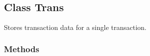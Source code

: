 
\subsection{Class Trans}

    \label{moira:Trans}
Stores transaction data for a single transaction.



  \subsubsection{Methods}

    \label{moira:Trans:__init__}

    \vspace{0.5ex}

